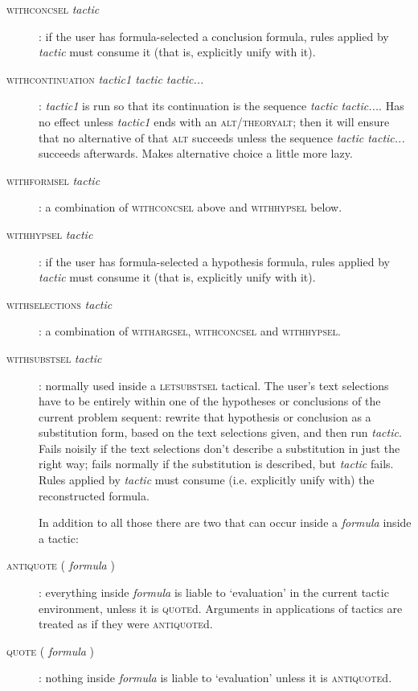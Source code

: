 \begin{description}
\item [\textsc{withconcsel} \textit{tactic}]: if the user has formula-selected a conclusion formula, rules applied by \textit{tactic} must consume it (that is, explicitly unify with it).


\item [\textsc{withcontinuation} \textit{tactic1 tactic tactic...}]: \textit{tactic1} is run so that its continuation is the sequence \textit{tactic tactic...}. Has no effect unless \textit{tactic1} ends with an \textsc{alt/theoryalt}; then it will ensure that no alternative of that \textsc{alt} succeeds unless the sequence \textit{tactic tactic...} succeeds afterwards. Makes alternative choice a little more lazy.


\item [\textsc{withformsel} \textit{tactic}]: a combination of \textsc{withconcsel} above and \textsc{withhypsel} below.


\item [\textsc{withhypsel} \textit{tactic}]: if the user has formula-selected a hypothesis formula, rules applied by \textit{tactic} must consume it (that is, explicitly unify with it).


\item [\textsc{withselections} \textit{tactic}]: a combination of \textsc{withargsel}, \textsc{withconcsel} and \textsc{withhypsel}.


\item [\textsc{withsubstsel} \textit{tactic}]: normally used inside a \textsc{letsubstsel} tactical. The user's text selections have to be entirely within one of the hypotheses or conclusions of the current problem sequent: rewrite that hypothesis or conclusion as a substitution form, based on the text selections given, and then run \textit{tactic}. Fails noisily if the text selections don't describe a substitution in just the right way; fails normally if the substitution is described, but \textit{tactic} fails. Rules applied by \textit{tactic} must consume (i.e. explicitly unify with) the reconstructed formula.


In addition to all those there are two that can occur inside a \textit{formula} inside a tactic:


\item [\textsc{antiquote} ( \textit{formula} )]: everything inside \textit{formula} is liable to `evaluation' in the current tactic environment, unless it is \textsc{quote}d. Arguments in applications of tactics are treated as if they were \textsc{antiquote}d.


\item [\textsc{quote} ( \textit{formula} )]: nothing inside \textit{formula} is liable to `evaluation' unless it is \textsc{antiquote}d.

\end{description}

